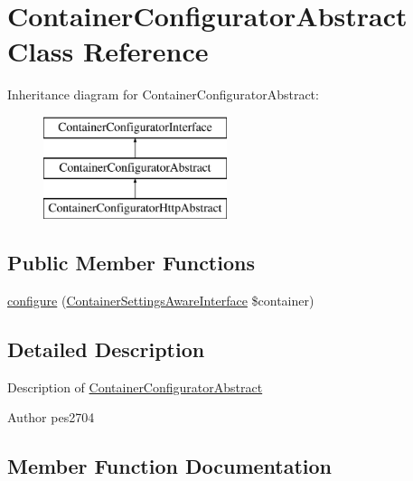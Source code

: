 \hypertarget{class_pes_1_1_container_1_1_container_configurator_abstract}{}\section{Container\+Configurator\+Abstract Class Reference}
\label{class_pes_1_1_container_1_1_container_configurator_abstract}
Inheritance diagram for Container\+Configurator\+Abstract\+:\begin{figure}[H]
\begin{center}
\leavevmode
\includegraphics[height=3.000000cm]{class_pes_1_1_container_1_1_container_configurator_abstract}
\end{center}
\end{figure}
\subsection*{Public Member Functions}
\begin{DoxyCompactItemize}
\item 
\mbox{\hyperlink{class_pes_1_1_container_1_1_container_configurator_abstract_aa010017c090252363602d277501f61f4}{configure}} (\mbox{\hyperlink{interface_pes_1_1_container_1_1_container_settings_aware_interface}{Container\+Settings\+Aware\+Interface}} \$container)
\end{DoxyCompactItemize}


\subsection{Detailed Description}
Description of \mbox{\hyperlink{class_pes_1_1_container_1_1_container_configurator_abstract}{Container\+Configurator\+Abstract}}

\begin{DoxyAuthor}{Author}
pes2704 
\end{DoxyAuthor}


\subsection{Member Function Documentation}
\mbox{\label{class_pes_1_1_container_1_1_container_configurator_abstract_aa010017c090252363602d277501f61f4}} 
